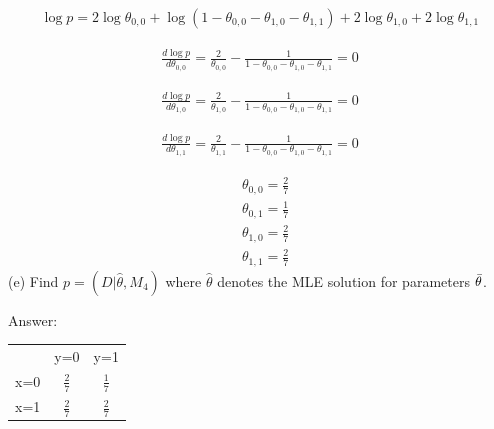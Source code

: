 \documentclass{article}
\begin{document}
\begin{equation}
\begin{aligned}
    \log p = 2\log\theta_{0,0} +\log(1- \theta_{0,0}-\theta_{1,0}-\theta_{1,1}) +2\log \theta_{1,0} +2\log \theta_{1,1}
\end{aligned}
\end{equation}

\begin{equation}
\begin{aligned}
    \frac{d \log p}{d \theta_{0,0}} = \frac{2}{\theta_{0,0}} - \frac{1}{1- \theta_{0,0}-\theta_{1,0}-\theta_{1,1}}=0
\end{aligned}
\end{equation}

\begin{equation}
\begin{aligned}
    \frac{d \log p}{d \theta_{1,0}} = \frac{2}{\theta_{1,0}} - \frac{1}{1- \theta_{0,0}-\theta_{1,0}-\theta_{1,1}}=0
\end{aligned}
\end{equation}

\begin{equation}
\begin{aligned}
    \frac{d \log p}{d \theta_{1,1}} = \frac{2}{\theta_{1,1}} - \frac{1}{1- \theta_{0,0}-\theta_{1,0}-\theta_{1,1}}=0
\end{aligned}
\end{equation}

\begin{equation}
\begin{aligned}
    & \theta_{0,0}=\frac{2}{7} \\
    & \theta_{0,1}=\frac{1}{7} \\
    & \theta_{1,0}=\frac{2}{7} \\
    & \theta_{1,1}=\frac{2}{7} 
\end{aligned}
\end{equation}
(e) Find $p = (D|\hat{\theta}, M_4)$ where $\hat{\theta}$ denotes the MLE solution for parameters $\Bar{\theta}$.

Answer:

\begin{center}
\begin{tabular}{ c c c }
   & y=0 & y=1 \\ 
x=0 & $\frac{2}{7}$ & $\frac{1}{7}$ \\  
x=1 & $\frac{2}{7}$ & $\frac{2}{7}$  
\end{tabular}
\end{center}
\end{document}
